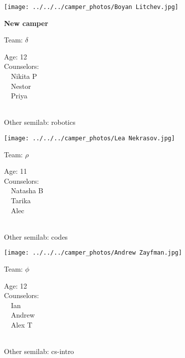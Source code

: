 \documentclass[10pt,letterpaper, landscape]{article}
\begin{document}
\horizontalshiftfornextsticker
\renewcommand{\baselinestretch}{1} \begin{sticker}
\noindent\begin{minipage}{0.5\textwidth}\texttt{[image: ../../../camper\_photos/Boyan Litchev.jpg]}\end{minipage}\begin{minipage}{0.45\textwidth}
\textbf{New camper} 

Team: {\Large $\delta$}

Age:        12\\
Counselors: \\\ \ Nikita P\\\ \ Nestor\\\ \ Priya\\
\end{minipage} \\ \vspace{0.07in}
Other semilab: robotics
\end{sticker}
\horizontalshiftfornextsticker
\renewcommand{\baselinestretch}{1} \begin{sticker}
\noindent\begin{minipage}{0.5\textwidth}\texttt{[image: ../../../camper\_photos/Lea Nekrasov.jpg]}\end{minipage}\begin{minipage}{0.45\textwidth}
Team: {\Large $\rho$}

Age:        11\\
Counselors: \\\ \ Natasha B\\\ \ Tarika\\\ \ Alec\\
\end{minipage} \\ \vspace{0.07in}
Other semilab: codes
\end{sticker}
\horizontalshiftfornextsticker
\renewcommand{\baselinestretch}{1} \begin{sticker}
\noindent\begin{minipage}{0.5\textwidth}\texttt{[image: ../../../camper\_photos/Andrew Zayfman.jpg]}\end{minipage}\begin{minipage}{0.45\textwidth}
Team: {\Large $\phi$}

Age:        12\\
Counselors: \\\ \ Ian\\\ \ Andrew\\\ \ Alex T\\
\end{minipage} \\ \vspace{0.07in}
Other semilab: cs-intro
\end{sticker}
\end{document}
